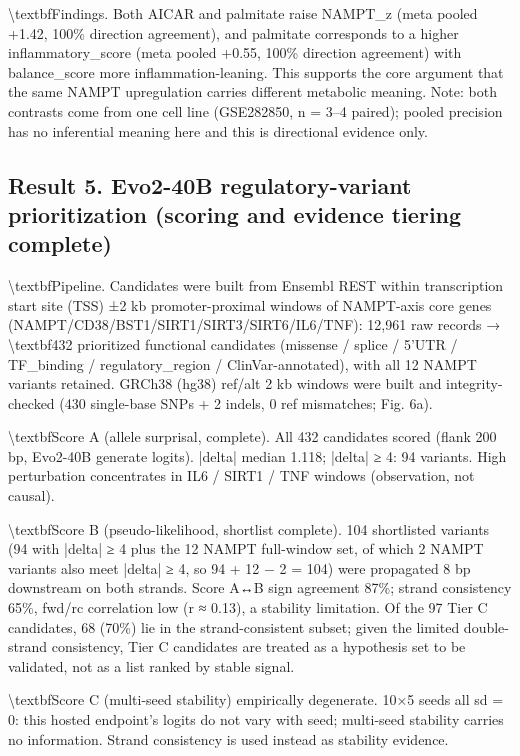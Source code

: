 \documentclass[11pt]{article}
\begin{document}
\textbackslash{}textbf{Findings.} Both AICAR and palmitate raise NAMPT\_z (meta pooled +1.42, 100\% direction agreement), and palmitate corresponds to a higher inflammatory\_score (meta pooled +0.55, 100\% direction agreement) with balance\_score more inflammation-leaning. This supports the core argument that the same NAMPT upregulation carries different metabolic meaning. Note: both contrasts come from one cell line (GSE282850, n = 3–4 paired); pooled precision has no inferential meaning here and this is directional evidence only.

\subsection*{Result 5. Evo2-40B regulatory-variant prioritization (scoring and evidence tiering complete)}
\textbackslash{}textbf{Pipeline.} Candidates were built from Ensembl REST within transcription start site (TSS) ±2 kb promoter-proximal windows of NAMPT-axis core genes (NAMPT/CD38/BST1/SIRT1/SIRT3/SIRT6/IL6/TNF): 12,961 raw records → \textbackslash{}textbf{432 prioritized functional candidates} (missense / splice / 5'UTR / TF\_binding / regulatory\_region / ClinVar-annotated), with all 12 NAMPT variants retained. GRCh38 (hg38) ref/alt 2 kb windows were built and integrity-checked (430 single-base SNPs + 2 indels, 0 ref mismatches; Fig. 6a).

\textbackslash{}textbf{Score A (allele surprisal, complete).} All 432 candidates scored (flank 200 bp, Evo2-40B generate logits). |delta| median 1.118; |delta| ≥ 4: 94 variants. High perturbation concentrates in IL6 / SIRT1 / TNF windows (observation, not causal).

\textbackslash{}textbf{Score B (pseudo-likelihood, shortlist complete).} 104 shortlisted variants (94 with |delta| ≥ 4 plus the 12 NAMPT full-window set, of which 2 NAMPT variants also meet |delta| ≥ 4, so 94 + 12 − 2 = 104) were propagated 8 bp downstream on both strands. Score A↔B sign agreement 87\%; strand consistency 65\%, fwd/rc correlation low (r ≈ 0.13), a stability limitation. Of the 97 Tier C candidates, 68 (70\%) lie in the strand-consistent subset; given the limited double-strand consistency, Tier C candidates are treated as a hypothesis set to be validated, not as a list ranked by stable signal.

\textbackslash{}textbf{Score C (multi-seed stability) empirically degenerate.} 10×5 seeds all sd = 0: this hosted endpoint's logits do not vary with seed; multi-seed stability carries no information. Strand consistency is used instead as stability evidence.
\end{document}
